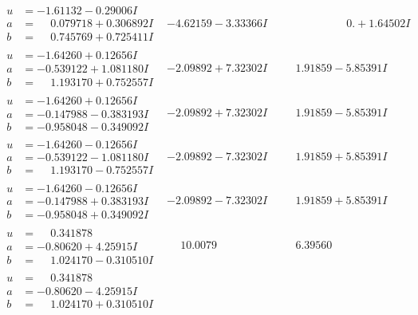 \documentclass[1p]{elsarticle_modified}
\theoremstyle{definition}
\begin{document}
$$\begin{array}{c|c|c}
\begin{aligned}
u &= -1.61132 - 0.29006 I \\
a &= \phantom{-}0.079718 + 0.306892 I \\
b &= \phantom{-}0.745769 + 0.725411 I\end{aligned}
 & -4.62159 - 3.33366 I & \phantom{-0.000000 -}0. + 1.64502 I \\ \hline\begin{aligned}
u &= -1.64260 + 0.12656 I \\
a &= -0.539122 + 1.081180 I \\
b &= \phantom{-}1.193170 + 0.752557 I\end{aligned}
 & -2.09892 + 7.32302 I & \phantom{-}1.91859 - 5.85391 I \\ \hline\begin{aligned}
u &= -1.64260 + 0.12656 I \\
a &= -0.147988 - 0.383193 I \\
b &= -0.958048 - 0.349092 I\end{aligned}
 & -2.09892 + 7.32302 I & \phantom{-}1.91859 - 5.85391 I \\ \hline\begin{aligned}
u &= -1.64260 - 0.12656 I \\
a &= -0.539122 - 1.081180 I \\
b &= \phantom{-}1.193170 - 0.752557 I\end{aligned}
 & -2.09892 - 7.32302 I & \phantom{-}1.91859 + 5.85391 I \\ \hline\begin{aligned}
u &= -1.64260 - 0.12656 I \\
a &= -0.147988 + 0.383193 I \\
b &= -0.958048 + 0.349092 I\end{aligned}
 & -2.09892 - 7.32302 I & \phantom{-}1.91859 + 5.85391 I \\ \hline\begin{aligned}
u &= \phantom{-}0.341878\phantom{ +0.000000I} \\
a &= -0.80620 + 4.25915 I \\
b &= \phantom{-}1.024170 - 0.310510 I\end{aligned}
 & \phantom{-}10.0079\phantom{ +0.000000I} & \phantom{-}6.39560\phantom{ +0.000000I} \\ \hline\begin{aligned}
u &= \phantom{-}0.341878\phantom{ +0.000000I} \\
a &= -0.80620 - 4.25915 I \\
b &= \phantom{-}1.024170 + 0.310510 I\end{aligned}

\end{array}$$
\end{document}
